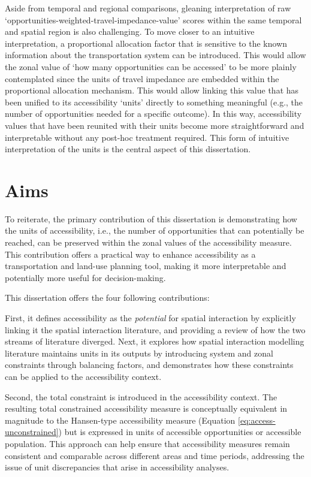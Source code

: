 \documentclass[
11pt, %
oneside, %
english, %
singlespacing, %
]{macthesis} %
\begin{document}
Aside from temporal and regional comparisons, gleaning interpretation of raw `opportunities-weighted-travel-impedance-value' scores within the same temporal and spatial region is also challenging. To move closer to an intuitive interpretation, a proportional allocation factor that is sensitive to the known information about the transportation system can be introduced. This would allow the zonal value of `how many opportunities can be accessed' to be more plainly contemplated since the units of travel impedance are embedded within the proportional allocation mechanism. This would allow linking this value that has been unified to its accessibility `units' directly to something meaningful (e.g., the number of opportunities needed for a specific outcome). In this way, accessibility values that have been reunited with their units become more straightforward and interpretable without any post-hoc treatment required. This form of intuitive interpretation of the units is the central aspect of this dissertation.

\section{Aims}\label{aims}

To reiterate, the primary contribution of this dissertation is demonstrating how the units of accessibility, i.e., the number of opportunities that can potentially be reached, can be preserved within the zonal values of the accessibility measure. This contribution offers a practical way to enhance accessibility as a transportation and land-use planning tool, making it more interpretable and potentially more useful for decision-making.

This dissertation offers the four following contributions:

First, it defines accessibility as the \emph{potential} for spatial interaction by explicitly linking it the spatial interaction literature, and providing a review of how the two streams of literature diverged. Next, it explores how spatial interaction modelling literature maintains units in its outputs by introducing system and zonal constraints through balancing factors, and demonstrates how these constraints can be applied to the accessibility context.

Second, the total constraint is introduced in the accessibility context. The resulting total constrained accessibility measure is conceptually equivalent in magnitude to the Hansen-type accessibility measure (Equation \ref{eq:access-unconstrained}) but is expressed in units of accessible opportunities or accessible population. This approach can help ensure that accessibility measures remain consistent and comparable across different areas and time periods, addressing the issue of unit discrepancies that arise in accessibility analyses.
\end{document}

